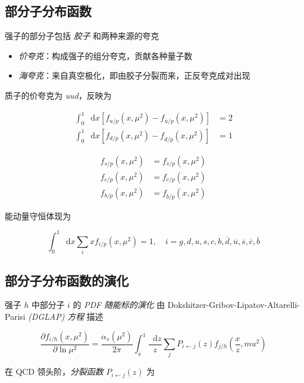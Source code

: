 \documentclass[oneside,a4paper,openany,11pt]{ctexbook}
\newcommand*{\dif}{\mathop{}\!\mathrm{d}} %
\begin{document}
\subsection{部分子分布函数}

强子的部分子包括 \emph{胶子} 和两种来源的夸克

\begin{itemize}
    \item \emph{价夸克}：构成强子的组分夸克，贡献各种量子数
    \item \emph{海夸克}：来自真空极化，即由胶子分裂而来，正反夸克成对出现
\end{itemize}

质子的价夸克为 \emph{uud}，反映为

\begin{align}
    \int_0^1 \dif x [f_{u/p}(x, \mu^2) - f_{\overline{u}/p}(x, \mu^2)] &= 2 \\
    \int_0^1 \dif x [f_{d/p}(x, \mu^2) - f_{\overline{d}/p}(x, \mu^2)] &= 1
\end{align}

\begin{align}
    f_{s/p}(x, \mu^2) &= f_{\overline{s}/p}(x, \mu^2) \\
    f_{c/p}(x, \mu^2) &= f_{\overline{c}/p}(x, \mu^2) \\
    f_{b/p}(x, \mu^2) &= f_{\overline{b}/p}(x, \mu^2)
\end{align}

能动量守恒体现为

\begin{equation}
    \int_0^1 \dif x \sum_i x f_{i/p}(x, \mu^2) = 1, \quad i = g, d, u, s, c, b, \overline{d}, \overline{u}, \overline{s}, \overline{c}, \overline{b}
\end{equation}

\subsection{部分子分布函数的演化}

强子 $h$ 中部分子 $i$ 的 \emph{PDF 随能标的演化} 由 Dokshitzer-Gribov-Lipatov-Altarelli-Parisi \emph{(DGLAP) 方程} 描述

\begin{equation}
    \frac{\partial f_{i/h}(x, \mu^2)}{\partial \ln \mu^2} = \frac{\alpha_s(\mu^2)}{2\pi} \int_x^1 \frac{\dif z}{z} \sum_j P_{i \gets j}(z) f_{j/h}\left(\frac{x}{z}, mu^2\right)
\end{equation}

在 QCD 领头阶，\emph{分裂函数} $P_{i \gets j}(z)$ 为
\end{document}
